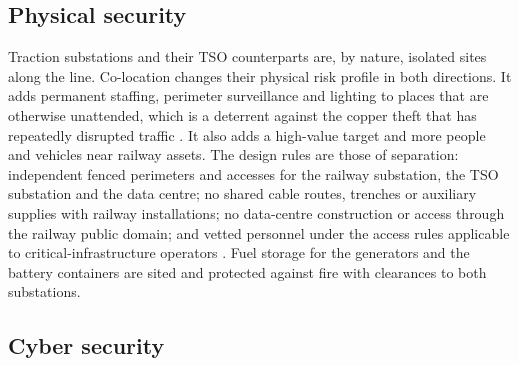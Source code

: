 \subsection{Physical security}

Traction substations and their TSO counterparts are, by nature, isolated sites along the line. Co-location changes their physical risk profile in both directions. It adds permanent staffing, perimeter surveillance and lighting to places that are otherwise unattended, which is a deterrent against the copper theft that has repeatedly disrupted traffic \cite{cable2026}. It also adds a high-value target and more people and vehicles near railway assets. The design rules are those of separation: independent fenced perimeters and accesses for the railway substation, the TSO substation and the data centre; no shared cable routes, trenches or auxiliary supplies with railway installations; no data-centre construction or access through the railway public domain; and vetted personnel under the access rules applicable to critical-infrastructure operators \cite{ley82011,cer2022}. Fuel storage for the generators and the battery containers are sited and protected against fire with clearances to both substations.

\subsection{Cyber security}

